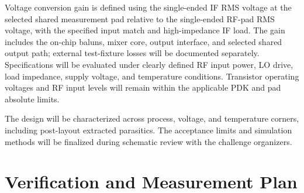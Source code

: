 \documentclass[11pt,letterpaper]{article}
\begin{document}
Voltage conversion gain is defined using the single-ended IF RMS voltage at the selected shared measurement pad relative to the single-ended RF-pad RMS voltage, with the specified input match and high-impedance IF load.
The gain includes the on-chip baluns, mixer core, output interface, and selected shared output path; external test-fixture losses will be documented separately.
Specifications will be evaluated under clearly defined RF input power, LO drive, load impedance, supply voltage, and temperature conditions.
Transistor operating voltages and RF input levels will remain within the applicable PDK and pad absolute limits.

The design will be characterized across process, voltage, and temperature corners, including post-layout extracted parasitics.
The acceptance limits and simulation methods will be finalized during schematic review with the challenge organizers.


\section{Verification and Measurement Plan}
\end{document}
